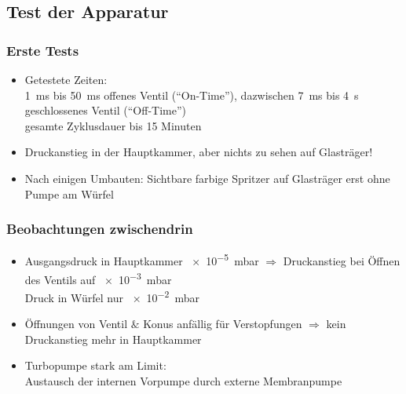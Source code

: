 \documentclass{beamer}
\begin{document}


\subsection[Ergebnisse]{Test der Apparatur}

\begin{frame}
\frametitle{Erste Tests}
\begin{itemize}\setlength{\itemsep}{+15pt}
  \item Getestete Zeiten: \\
  \SI{1}{ms} bis \SI{50}{ms} offenes Ventil ("`On-Time"'), dazwischen \SI{7}{ms} bis \SI{4}{s} geschlossenes
  Ventil ("`Off-Time"')\\ 
  gesamte Zyklusdauer bis 15 Minuten
  \item Druckanstieg in der Hauptkammer, aber nichts zu sehen auf Glasträger!
  \item Nach einigen Umbauten: Sichtbare farbige Spritzer auf Glasträger erst ohne Pumpe am Würfel
\end{itemize}
\end{frame}


\begin{frame}
\frametitle{Beobachtungen zwischendrin}
\begin{itemize}\setlength{\itemsep}{+15pt}
  \item Ausgangsdruck in Hauptkammer \SI{e-5}{mbar} $\Rightarrow$ Druckanstieg bei Öffnen des
  Ventils auf \SI{e-3}{mbar}\\
  Druck in Würfel nur \SI{e-2}{mbar}
  \item Öffnungen von Ventil $\&$ Konus anfällig für Verstopfungen $\Rightarrow$ kein Druckanstieg
  mehr in Hauptkammer
  \item Turbopumpe stark am Limit:\\
  Austausch der internen Vorpumpe durch externe Membranpumpe
\end{itemize}
\end{frame}
\end{document}

